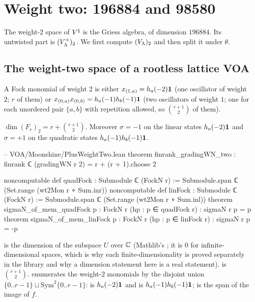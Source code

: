 \section{Weight two: 196884 and 98580}\label{ch04:sec:wttwo}

The weight-$2$ space of ${V^{\natural}}$ is the Griess algebra, of dimension $196884$. Its untwisted part
is $(V_{\Lambda}^+)_2$. We first compute $(V_{\Lambda})_2$ and then split it under $\theta$.

\subsection{The weight-two space of a rootless lattice VOA}

A Fock monomial of weight $2$ is either $x_{(1,a)}=h_a(-2)\mathbf{1}$ (one oscillator of weight $2$;
$r$ of them) or $x_{(0,a)}x_{(0,b)}=h_a(-1)h_b(-1)\mathbf{1}$ (two oscillators of weight $1$; one for
each unordered pair $\{a,b\}$ with repetition allowed, so $\binom{r+1}{2}$ of them).

\begin{proposition}\label{ch04:prop:fockwt2}
$\dim(F_r)_2=r+\binom{r+1}{2}$. Moreover $\sigma=-1$ on the linear states $h_a(-2)\mathbf{1}$ and
$\sigma=+1$ on the quadratic states $h_a(-1)h_b(-1)\mathbf{1}$.
\end{proposition}

\begin{leancode}
-- VOA/Moonshine/PlusWeightTwo.lean
theorem finrank_gradingWN_two : finrank ℂ (gradingWN r 2) = r + (r + 1).choose 2

noncomputable def quadFock : Submodule ℂ (FockN r) :=
  Submodule.span ℂ (Set.range (wt2Mon r ∘ Sum.inr))
noncomputable def linFock : Submodule ℂ (FockN r) :=
  Submodule.span ℂ (Set.range (wt2Mon r ∘ Sum.inl))
theorem sigmaN_of_mem_quadFock {p : FockN r} (hp : p ∈ quadFock r) : sigmaN r p = p
theorem sigmaN_of_mem_linFock {p : FockN r} (hp : p ∈ linFock r) : sigmaN r p = -p
\end{leancode}

\begin{dictionary}
 is the dimension of the subspace $U$ over ${\mathbb{C}}$ (Mathlib's ;
it is $0$ for infinite-dimensional spaces, which is why each finite-dimensionality is proved
separately in the library and why a dimension statement here is a real statement).
 is $\binom{r+1}{2}$.  enumerates the weight-$2$ monomials by
the disjoint union $\{0..r-1\}\sqcup\mathrm{Sym}^2\{0..r-1\}$:  is $h_a(-2)\mathbf{1}$
and  is $h_a(-1)h_b(-1)\mathbf{1}$;  is the
span of the image of $f$.
\end{dictionary}

